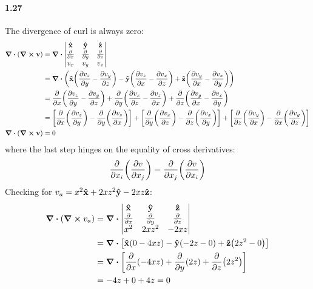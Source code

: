 \documentclass[../main.tex]{subfiles}
\begin{document}
\paragraph{1.27}
The divergence of curl is always zero:
\begin{align*}
    \div(\curl{\vb{v}}) &= \div \begin{vmatrix}
        \vu{x} & \vu{y} & \vu{z} \\
        \pdv{x} & \pdv{y} & \pdv{z} \\
        v_x & v_y & v_z
    \end{vmatrix} \\
    &= \div \qt(\vu{x} \qt(\pdv{v_z}{y} - \pdv{v_y}{z}) 
        - \vu{y} \qt(\pdv{v_z}{x} - \pdv{v_x}{z})
        + \vu{z} \qt(\pdv{v_y}{x} - \pdv{v_x}{y})) \\
    &= \pdv{x} \qt(\pdv{v_z}{y} - \pdv{v_y}{z})
        + \pdv{y} \qt(\pdv{v_x}{z} - \pdv{v_z}{x})
        + \pdv{z} \qt(\pdv{v_y}{x} - \pdv{v_x}{y}) \\
    &= \qt[\pdv{x}(\pdv{v_z}{y}) - \pdv{y}(\pdv{v_z}{x})]
        + \qt[\pdv{y}(\pdv{v_x}{z}) - \pdv{z}(\pdv{v_x}{y})]
        + \qt[\pdv{z}(\pdv{v_y}{x}) - \pdv{x}(\pdv{v_y}{z})] \\
    \div(\curl{\vb{v}}) &= 0
\end{align*}
where the last step hinges on the equality of cross derivatives:
\begin{align*}
    \pdv{x_i}(\pdv{v}{x_j}) &= \pdv{x_j}(\pdv{v}{x_i}) \\
\end{align*}
Checking for $v_a = x^2\vu{x} + 2xz^2 \vu{y} - 2xz \vu{z}$:
\begin{align*}
    \div(\curl{v_a}) &= \div \begin{vmatrix}
        \vu{x} & \vu{y} & \vu{z} \\
        \pdv{x} & \pdv{y} & \pdv{z} \\
        x^2 & 2xz^2 & -2xz
    \end{vmatrix} \\
    &= \div \qt[\vu{x} \qt(0 - 4xz) - \vu{y} \qt(-2z - 0) + \vu{z} \qt(2z^2 - 0)] \\
    &= \div \qt[\pdv{x}(-4xz) + \pdv{y}(2z) + \pdv{z}(2z^2)]\\
    &= -4z + 0 + 4z = 0
\end{align*}
\end{document}
